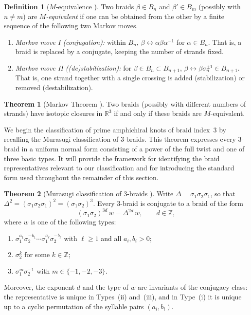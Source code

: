 \documentclass[11pt]{article}
\theoremstyle{definition}
\newtheorem{theorem}{Theorem}[section]
\newtheorem{definition}[definition]{Definition}
\begin{document}
\begin{definition}[$M$-equivalence {\cite{KasselTuraev}}]\label{def:Mequiv}
Two braids $\beta\in B_{n}$ and $\beta'\in B_{m}$ (possibly with $n\ne m$) are
\emph{$M$-equivalent} if one can be obtained from the other by a finite sequence
of the following two Markov moves.
\begin{enumerate}[label=\textup{(\alph*)}]
\item \emph{Markov move I (conjugation):} within $B_{n}$,
$\beta\leftrightarrow\alpha\beta\alpha^{-1}$ for $\alpha\in B_{n}$. That is, a braid
is replaced by a conjugate, keeping the number of strands fixed.
\item \emph{Markov move II ((de)stabilization):} for
$\beta\in B_{n}\subset B_{n+1}$, $\beta\leftrightarrow\beta\sigma_{n}^{\pm1}\in
B_{n+1}$. That is, one strand together with a single crossing is added
(stabilization) or removed (destabilization).
\end{enumerate}
\end{definition}

\begin{theorem}[Markov Theorem {\cite[Theorem~2.8]{KasselTuraev}}]\label{thm:markov}
Two braids (possibly with different numbers of strands) have isotopic closures
in $\mathbb{R}^{3}$ if and only if these braids are $M$-equivalent.
\end{theorem}

\noindent We begin the classification of prime amphichiral knots of braid index~$3$ by recalling the Murasugi classification of $3$-braids. This theorem expresses every $3$-braid in a uniform normal form consisting of a power of the full twist and one of three basic types. It will provide the framework for identifying the braid representatives relevant to our classification and for introducing the standard form used throughout the remainder of this section.

\begin{theorem}[Murasugi classification of $3$-braids {\cite[Theorem~6.1]{DasbachLowrance2011}}]\label{thm:murasugi}
Write $\Delta=\sigma_{1}\sigma_{2}\sigma_{1}$, so that
$\Delta^{2}=(\sigma_{1}\sigma_{2}\sigma_{1})^{2}=(\sigma_{1}\sigma_{2})^{3}$. Every
$3$-braid is conjugate to a braid of the form
\[
(\sigma_{1}\sigma_{2})^{3d}\,w=\Delta^{2d}\,w,\qquad d\in\mathbb{Z},
\]
where $w$ is one of the following types:
\begin{enumerate}[label=\textup{(\roman*)}]
\item $\sigma_{1}^{a_1}\sigma_{2}^{-b_1}\cdots\sigma_{1}^{a_\ell}\sigma_{2}^{-b_\ell}$
with $\ell\ge 1$ and all $a_i,b_i>0$;
\item $\sigma_{2}^{k}$ for some $k\in\mathbb{Z}$;
\item $\sigma_{1}^{m}\sigma_{2}^{-1}$ with $m\in\{-1,-2,-3\}$.
\end{enumerate}
Moreover, the exponent $d$ and the type of $w$ are invariants of the conjugacy
class: the representative is unique in Types~\textup{(ii)} and~\textup{(iii)}, and in
Type~\textup{(i)} it is unique up to a cyclic permutation of the syllable pairs
$(a_i,b_i)$.
\end{theorem}
\end{document}
